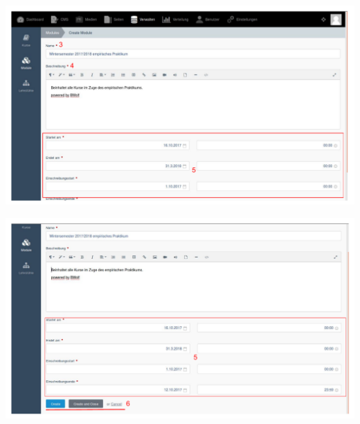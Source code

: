     \includegraphics[scale=0.3]{backend/img/module_2.pdf}

    \includegraphics[scale=0.3]{backend/img/module_3.pdf}
    
